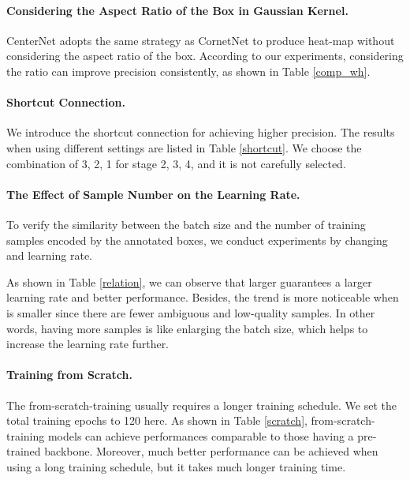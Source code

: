 \documentclass[letterpaper]{article} \usepackage{aaai20}  \usepackage{times}  \usepackage{helvet} \usepackage{courier}  \usepackage[hyphens]{url}  \usepackage{graphicx} \urlstyle{rm} \def\UrlFont{\rm}  \usepackage{graphicx}  \frenchspacing  \setlength{\pdfpagewidth}{8.5in}  \setlength{\pdfpageheight}{11in}  \usepackage{subcaption}
\begin{document}
\paragraph{Considering the Aspect Ratio of the Box in Gaussian Kernel.} CenterNet adopts the same strategy as CornetNet to produce heat-map without considering the aspect ratio of the box. According to our experiments, considering the ratio can improve precision consistently, as shown in Table \ref{comp_wh}.


\paragraph{Shortcut Connection.} We introduce the shortcut connection for achieving higher precision. The results when using different settings are listed in Table \ref{shortcut}. We choose the combination of 3, 2, 1 for stage 2, 3, 4, and it is not carefully selected.

\paragraph{The Effect of Sample Number on the Learning Rate.} To verify the similarity between the batch size and the number of training samples encoded by the annotated boxes, we conduct experiments by changing  and learning rate.

As shown in Table \ref{relation}, we can observe that larger  guarantees a larger learning rate and better performance. Besides, the trend is more noticeable when  is smaller since there are fewer ambiguous and low-quality samples. In other words, having more samples is like enlarging the batch size, which helps to increase the learning rate further.

\paragraph{Training from Scratch.} The from-scratch-training usually requires a longer training schedule. We set the total training epochs to 120 here. As shown in Table \ref{scratch}, from-scratch-training models can achieve performances comparable to those having a pre-trained backbone. Moreover, much better performance can be achieved when using a long training schedule, but it takes much longer training time.
\end{document}
